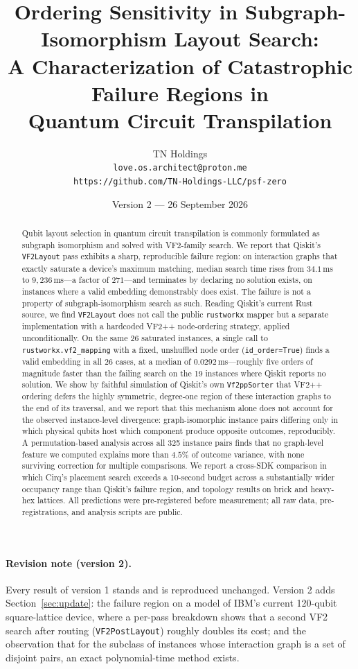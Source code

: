 \documentclass[11pt]{article}
\title{Ordering Sensitivity in Subgraph-Isomorphism Layout Search:\\
A Characterization of Catastrophic Failure Regions in\\
Quantum Circuit Transpilation}
\author{TN Holdings\\
\texttt{love.os.architect@proton.me}\\
\texttt{https://github.com/TN-Holdings-LLC/psf-zero}}
\date{Version 2 --- 26 September 2026}
\begin{document}
\maketitle

\begin{abstract}
Qubit layout selection in quantum circuit transpilation is commonly
formulated as subgraph isomorphism and solved with VF2-family search.
We report that Qiskit's \texttt{VF2Layout} pass exhibits a sharp,
reproducible failure region: on interaction graphs that exactly
saturate a device's maximum matching, median search time rises from
$34.1$\,ms to $9{,}236$\,ms---a factor of $271$---and terminates by
declaring no solution exists, on instances where a valid embedding
demonstrably does exist. The failure is not a property of
subgraph-isomorphism search as such. Reading Qiskit's current Rust
source, we find \texttt{VF2Layout} does not call the public
\texttt{rustworkx} mapper but a separate implementation with a
hardcoded VF2++ node-ordering strategy, applied unconditionally. On
the same 26 saturated instances, a single call to
\texttt{rustworkx.vf2\_mapping} with a fixed, unshuffled node order
(\texttt{id\_order=True}) finds a valid embedding in all 26 cases, at a
median of $0.0292$\,ms---roughly five orders of magnitude faster than
the failing search on the 19 instances where Qiskit reports no
solution. We show by faithful simulation of Qiskit's own
\texttt{Vf2ppSorter} that VF2++ ordering defers the highly symmetric,
degree-one region of these interaction graphs to the end of its
traversal, and we report that this mechanism alone does not account for
the observed instance-level divergence: graph-isomorphic instance pairs
differing only in which physical qubits host which component produce
opposite outcomes, reproducibly. A permutation-based analysis across
all 325 instance pairs finds that no graph-level feature we computed
explains more than $4.5\%$ of outcome variance, with none surviving
correction for multiple comparisons. We report a cross-SDK comparison
in which Cirq's placement search exceeds a 10-second budget across a
substantially wider occupancy range than Qiskit's failure region, and
topology results on brick and heavy-hex lattices. All predictions were
pre-registered before measurement; all raw data, pre-registrations, and
analysis scripts are public.
\end{abstract}

\paragraph{Revision note (version 2).} Every result of version 1 stands
and is reproduced unchanged. Version 2 adds Section~\ref{sec:update}: the
failure region on a model of IBM's current 120-qubit square-lattice
device, where a per-pass breakdown shows that a second VF2 search after
routing (\texttt{VF2PostLayout}) roughly doubles its cost; and the
observation that for the subclass of instances whose interaction graph
is a set of disjoint pairs, an exact polynomial-time method exists.
\end{document}
